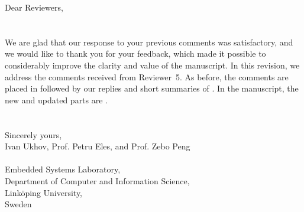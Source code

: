 Dear Reviewers,
\\
\\
\\
\noindent We are glad that our response to your previous comments was satisfactory, and we would like to thank you for your feedback, which made it possible to considerably improve the clarity and value of the manuscript.
In this revision, we address the comments received from Reviewer~5.
As before, the comments are placed in  followed by our replies and short summaries of .
In the manuscript, the new and updated parts are .
\\
\\
\\
\noindent Sincerely yours,\\
Ivan Ukhov, Prof. Petru Eles, and Prof. Zebo Peng
\\
\\
\noindent Embedded Systems Laboratory,\\
Department of Computer and Information Science,\\
Link\"{o}ping University,\\
Sweden
